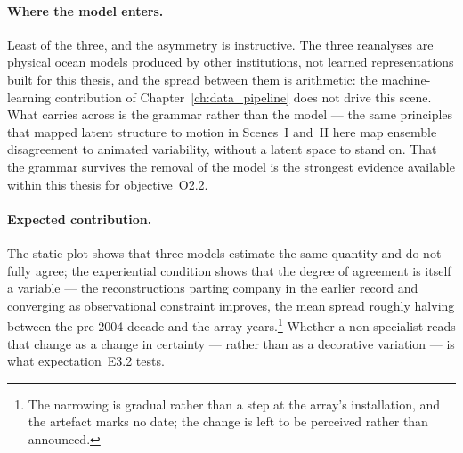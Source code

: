 \paragraph{Where the model enters.} Least of the three, and the asymmetry is instructive. The three reanalyses are physical ocean models produced by other institutions, not learned representations built for this thesis, and the spread between them is arithmetic: the machine-learning contribution of Chapter~\ref{ch:data_pipeline} does not drive this scene. What carries across is the grammar rather than the model --- the same principles that mapped latent structure to motion in Scenes~I and~II here map ensemble disagreement to animated variability, without a latent space to stand on. That the grammar survives the removal of the model is the strongest evidence available within this thesis for objective~O2.2.

\paragraph{Expected contribution.} The static plot shows that three models estimate the same quantity and do not fully agree; the experiential condition shows that the degree of agreement is itself a variable --- the reconstructions parting company in the earlier record and converging as observational constraint improves, the mean spread roughly halving between the pre-2004 decade and the array years.\footnote{The narrowing is gradual rather than a step at the array's installation, and the artefact marks no date; the change is left to be perceived rather than announced.} Whether a non-specialist reads that change as a change in certainty --- rather than as a decorative variation --- is what expectation~E3.2 tests.

